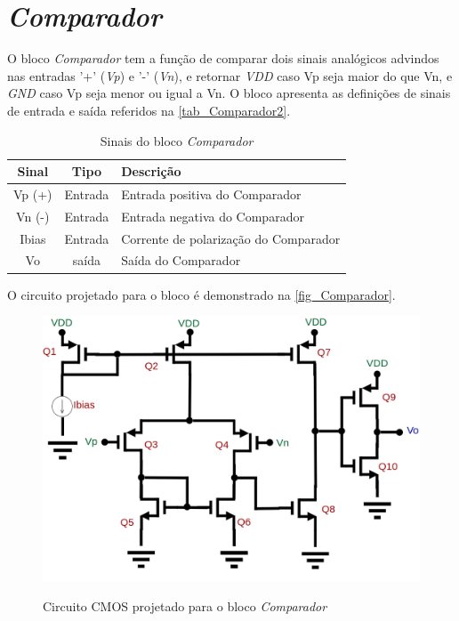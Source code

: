 \renewcommand{\NomeBloco}{\emph{Comparador}}
\renewcommand{\NomeBlocoNoIt}{Comparador}
\renewcommand{\NomePTab}{tab_\NomeBloco}
\renewcommand{\NomeSTab}{tab_\NomeBlocoNoIt2}
\renewcommand{\NomePFig}{fig_\NomeBlocoNoIt}
\renewcommand{\NomeSFig}{fig_\NomeBlocoNoIt2}
\renewcommand{\NomeTTab}{tab_\NomeBlocoNoIt3}

\section{\NomeBloco}

O bloco \NomeBloco{} tem a fun{\c c}\~ao de comparar dois sinais anal\'ogicos advindos nas entradas '+' (\emph{Vp}) e '-' (\emph{Vn}), e retornar \emph{VDD} caso Vp seja maior do que Vn, e \emph{GND} caso Vp seja menor ou igual a Vn.  O bloco apresenta as defini{\c c}\~oes de sinais de entrada e sa\'ida referidos na \autoref{\NomeSTab}.

\begin{table}[htbp]
\caption{Sinais do bloco \NomeBloco}
\label{\NomeSTab}
\centering
\begin{tabular}{ccl}

    \toprule
    Sinal & Tipo    & Descri{\c c}\~ao        \\
    \midrule \midrule
    Vp (+) & Entrada & Entrada positiva do Comparador\\
    \midrule
    Vn (-) & Entrada & Entrada negativa do Comparador\\
    \midrule
    Ibias & Entrada & Corrente de polariza{\c c}\~ao do Comparador\\
    \midrule
    Vo & sa\'ida & Sa\'ida do Comparador\\
    \bottomrule
\end{tabular}
\end{table}

O circuito projetado para o bloco \'e demonstrado na \autoref{\NomePFig}.

\begin{figure}[htb]
 \centering
    \centering
    \caption{Circuito CMOS projetado para o bloco \NomeBloco} 
    \includegraphics[scale=0.3]{Circuitos/Comparator.png}
    \label{\NomePFig}
\end{figure}

